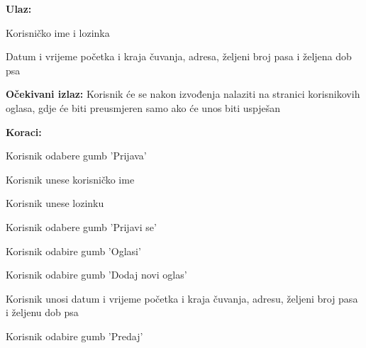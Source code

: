  			\begin{packed_item}
 				
 				\item \textbf{Ulaz: }
 				
 				\item[] \begin{packed_item}
 					
 					\item Korisničko ime i lozinka
 					\item Datum i vrijeme početka i kraja čuvanja, adresa, željeni broj pasa i željena dob psa
 					 					
 				\end{packed_item}
 			
 				\item  \textbf{Očekivani izlaz:} Korisnik će se nakon izvođenja nalaziti na stranici korisnikovih oglasa, gdje će biti preusmjeren samo ako će unos biti uspješan
 				\item  \textbf{Koraci:}
 				
 				\item[] \begin{packed_enum}
 					
 					\item Korisnik odabere gumb 'Prijava'
 					\item Korisnik unese korisničko ime
 					\item Korisnik unese lozinku
 					\item Korisnik odabere gumb 'Prijavi se'
 					\item Korisnik odabire gumb 'Oglasi'
 					\item Korisnik odabire gumb 'Dodaj novi oglas'
 					\item Korisnik unosi datum i vrijeme početka i kraja čuvanja, adresu, željeni broj pasa i željenu dob psa
 					\item Korisnik odabire gumb 'Predaj'
 					
 				\end{packed_enum}
 			\end{packed_item}
 			
